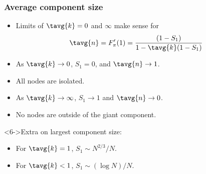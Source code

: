 
\begin{frame}[label=]
  \frametitle{Average component size}
  \begin{itemize}
  \item<1->
    Limits of $\tavg{k}=0$ and $\infty$ make sense for
    $$
    \tavg{n} 
    = 
    F'_{\pi}(1)
    =
    \frac{
      \left(
        1-S_1
      \right)
    }
    {
      1 -
      \tavg{k}(1-S_1)
    }
    $$
  \item<2->
    As $\tavg{k} \rightarrow 0$, $S_1=0$, and $\tavg{n} \rightarrow 1$.
  \item<3->
    All nodes are isolated.
  \item<4->
    As $\tavg{k} \rightarrow \infty$, $S_1\rightarrow 1$
    and $\tavg{n} \rightarrow 0$.
  \item<5->
    No nodes are outside of the giant component.
  \end{itemize}

  \begin{block}<6->{Extra on largest component size:}
    \begin{itemize}
    \item<6->
      For $\tavg{k}=1$, $S_1 \sim N^{2/3}/N$.
    \item<7->
      For $\tavg{k}< 1$, $S_1 \sim (\log N)/N$.
    \end{itemize}
  \end{block}
  
\end{frame}

%
%


